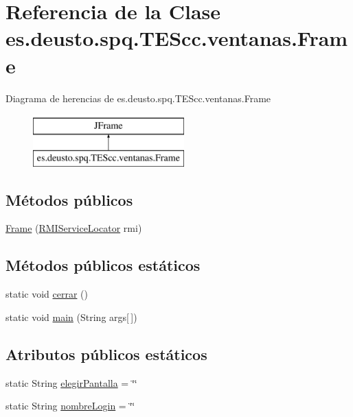 \hypertarget{classes_1_1deusto_1_1spq_1_1_t_e_scc_1_1ventanas_1_1_frame}{\section{Referencia de la Clase es.\+deusto.\+spq.\+T\+E\+Scc.\+ventanas.\+Frame}
\label{classes_1_1deusto_1_1spq_1_1_t_e_scc_1_1ventanas_1_1_frame}
}
Diagrama de herencias de es.\+deusto.\+spq.\+T\+E\+Scc.\+ventanas.\+Frame\begin{figure}[H]
\begin{center}
\leavevmode
\includegraphics[height=2.000000cm]{classes_1_1deusto_1_1spq_1_1_t_e_scc_1_1ventanas_1_1_frame}
\end{center}
\end{figure}
\subsection*{Métodos públicos}
\begin{DoxyCompactItemize}
\item 
\hyperlink{classes_1_1deusto_1_1spq_1_1_t_e_scc_1_1ventanas_1_1_frame_ac9c21cf59cf42b9c76e62f1383567bd6}{Frame} (\hyperlink{classes_1_1deusto_1_1spq_1_1_t_e_scc_1_1cliente_1_1_r_m_i_service_locator}{R\+M\+I\+Service\+Locator} rmi)
\end{DoxyCompactItemize}
\subsection*{Métodos públicos estáticos}
\begin{DoxyCompactItemize}
\item 
static void \hyperlink{classes_1_1deusto_1_1spq_1_1_t_e_scc_1_1ventanas_1_1_frame_a1870b172f7c7a60464a1944e7947eb02}{cerrar} ()
\item 
static void \hyperlink{classes_1_1deusto_1_1spq_1_1_t_e_scc_1_1ventanas_1_1_frame_aea1e679912397dc9e10103be2d60d98f}{main} (String args\mbox{[}$\,$\mbox{]})
\end{DoxyCompactItemize}
\subsection*{Atributos públicos estáticos}
\begin{DoxyCompactItemize}
\item 
static String \hyperlink{classes_1_1deusto_1_1spq_1_1_t_e_scc_1_1ventanas_1_1_frame_a8d3a59e352c2ac3dc45ab73307a3cc12}{elegir\+Pantalla} = \char`\"{}\char`\"{}
\item 
static String \hyperlink{classes_1_1deusto_1_1spq_1_1_t_e_scc_1_1ventanas_1_1_frame_a1b79f2ac2def7c9b54ffc2ad0bee38b3}{nombre\+Login} = \char`\"{}\char`\"{}
\end{DoxyCompactItemize}


